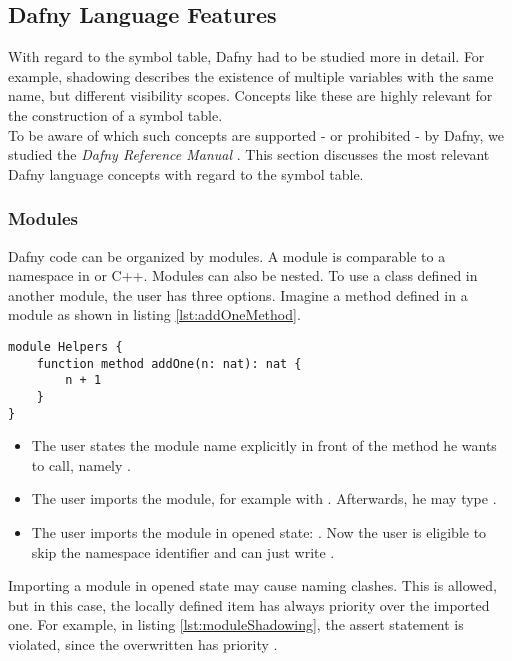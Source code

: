 \subsection{Dafny Language Features}
With regard to the symbol table, Dafny had to be studied more in detail.
For example, shadowing describes the existence of multiple variables with the same name, but different visibility scopes.
Concepts like these are highly relevant for the construction of a symbol table. \\

To be aware of which such concepts are supported - or prohibited - by Dafny, we studied the \textit{Dafny Reference Manual} \cite{dafnyReferenceManual}.
This section discusses the most relevant Dafny language concepts with regard to the symbol table.

\subsubsection{Modules}
Dafny code can be organized by modules.
A module is comparable to a namespace in \CsharpWithSpace or C++.
Modules can also be nested.
To use a class defined in another module, the user has three options.
Imagine a method  defined in a module  as shown in listing \ref{lst:addOneMethod}.

\begin{lstlisting}[language=dafny, caption={Module Example}, captionpos=b, label={lst:addOneMethod}]
module Helpers {
    function method addOne(n: nat): nat {
        n + 1
    }
}
\end{lstlisting}

\begin{itemize}
    \item The user states the module name explicitly in front of the method he wants to call, \linebreak namely .
    \item The user imports the module, for example with .
    Afterwards, he may type .
    \item The user imports the module in opened state: .
    Now the user is eligible to skip the namespace identifier and can just write .
\end{itemize}

Importing a module in opened state may cause naming clashes.
This is allowed, but in this case, the locally defined item has always priority over the imported one.
For example, in listing \ref{lst:moduleShadowing}, the assert statement is violated, since the overwritten  has priority \cite{functionVSMethod}.

